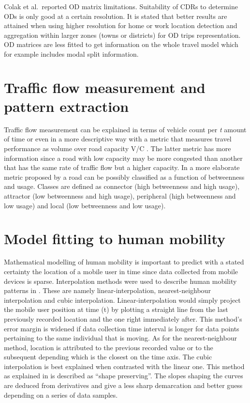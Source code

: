 \documentclass[12pt, a4paper]{report}
\theoremstyle{definition}
\theoremstyle{definition}%
\theoremstyle{definition}%
\theoremstyle{definition}%
\theoremstyle{definition}%
\theoremstyle{definition}%
\begin{document}
Colak et al.\ reported OD matrix limitations. Suitability of CDRs to determine ODs is only good at a certain resolution. It is stated that better results are attained when using higher resolution for home or work location detection and aggregation within larger zones (towns or districts) for OD trips representation. OD matrices are less fitted to get information on the whole travel model which for example includes modal split information.


\section{Traffic flow measurement and pattern extraction} \label{section:traffic_flow_measurement_and_pattern_extraction}
Traffic flow measurement can be explained in terms of vehicle count per \textit{t} amount of time or even in a more descriptive way with a metric that measures travel performance as volume over road capacity V/C \cite{Toole2015}. The latter metric has more information since a road with low capacity may be more congested than another that has the same rate of traffic flow but a higher capacity. In a more elaborate metric proposed by \cite{Toole2015} a road can be possibly classified as a function of betweenness and usage. Classes are defined as connector (high betweenness and high usage), attractor (low betweenness and high usage), peripheral (high betweenness and low usage) and local (low betweenness and low usage).


\section{Model fitting to human mobility} \label{section:human_mobility_modelling}
Mathematical modelling of human mobility is important to predict with a stated certainty the location of a mobile user in time since data collected from mobile devices is sparse. Interpolation methods were used to describe human mobility patterns in \cite{Hoteit2014}. These are namely linear-interpolation, nearest-neighbour interpolation and cubic interpolation. Linear-interpolation would simply project the mobile user position at time (t) by plotting a straight line from the last previously recorded location and the one right immediately after. This method's error margin is widened if data collection time interval is longer for data points pertaining to the same individual that is moving. As for the nearest-neighbour method, location is attributed to the previous recorded value or to the subsequent depending which is the closest on the time axis. The cubic interpolation is best explained when contrasted with the linear one. This method as explained in \cite{Hoteit2014}  is described as ``shape preserving''. The slopes shaping the curves are deduced from derivatives and give a less sharp demarcation and better guess depending on a series of data samples.
\end{document}
